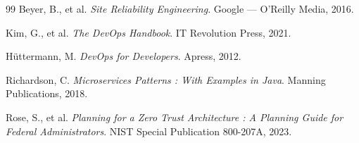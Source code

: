 \documentclass[12pt, a4paper, twoside]{report}
\begin{document}
\begin{thebibliography}{99}
Beyer, B., et al.
\textit{Site Reliability Engineering}.
Google --- O'Reilly Media, 2016.

Kim, G., et al.
\textit{The DevOps Handbook}.
IT Revolution Press, 2021.

Hüttermann, M.
\textit{DevOps for Developers}.
Apress, 2012.

Richardson, C.
\textit{Microservices Patterns : With Examples in Java}.
Manning Publications, 2018.

Rose, S., et al.
\textit{Planning for a Zero Trust Architecture : A Planning Guide for Federal Administrators}.
NIST Special Publication 800-207A, 2023.



\end{thebibliography}
\end{document}
